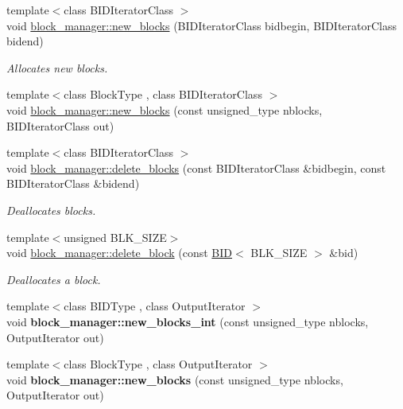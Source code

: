 \begin{CompactItemize}
\item 
{\footnotesize template$<$class BIDIteratorClass $>$ }\\void \hyperlink{group__mnglayer_gb012fd7abe2b4b529b9f6b339aff4232}{block\_\-manager::new\_\-blocks} (BIDIteratorClass bidbegin, BIDIteratorClass bidend)
\begin{CompactList}\small\item\em Allocates new blocks. \item\end{CompactList}\item 
{\footnotesize template$<$class BlockType , class BIDIteratorClass $>$ }\\void \hyperlink{group__mnglayer_ge77531e60b365f05da213ba7d8b17c9a}{block\_\-manager::new\_\-blocks} (const unsigned\_\-type nblocks, BIDIteratorClass out)
\item 
{\footnotesize template$<$class BIDIteratorClass $>$ }\\void \hyperlink{group__mnglayer_g0a41492a2faef107fb3c5a7c1ce5ee2d}{block\_\-manager::delete\_\-blocks} (const BIDIteratorClass \&bidbegin, const BIDIteratorClass \&bidend)
\begin{CompactList}\small\item\em Deallocates blocks. \item\end{CompactList}\item 
{\footnotesize template$<$unsigned BLK\_\-SIZE$>$ }\\void \hyperlink{group__mnglayer_g021e2ef7f3d56eb6dda56958ff5e0739}{block\_\-manager::delete\_\-block} (const \hyperlink{structBID}{BID}$<$ BLK\_\-SIZE $>$ \&bid)
\begin{CompactList}\small\item\em Deallocates a block. \item\end{CompactList}\item 
\hypertarget{group__mnglayer_g7f79d73b67f9353279c7da98450bb2da}{
{\footnotesize template$<$class BIDType , class OutputIterator $>$ }\\void \textbf{block\_\-manager::new\_\-blocks\_\-int} (const unsigned\_\-type nblocks, OutputIterator out)}
\label{group__mnglayer_g7f79d73b67f9353279c7da98450bb2da}

\item 
\hypertarget{group__mnglayer_gb141f255591ea232174c110922490f3b}{
{\footnotesize template$<$class BlockType , class OutputIterator $>$ }\\void \textbf{block\_\-manager::new\_\-blocks} (const unsigned\_\-type nblocks, OutputIterator out)}
\label{group__mnglayer_gb141f255591ea232174c110922490f3b}

\end{CompactItemize}
